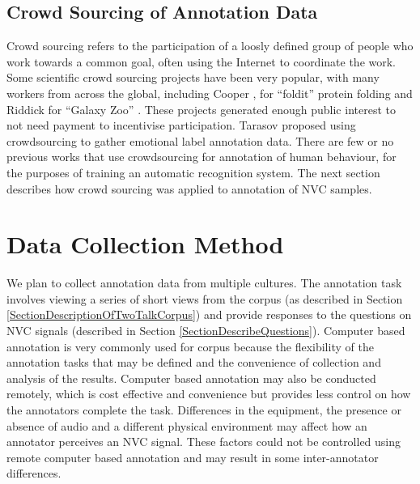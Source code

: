 
\subsection{Crowd Sourcing of Annotation Data}

Crowd sourcing refers to the participation of a loosly defined group of people who work towards a common goal, often using the Internet to coordinate the work. Some scientific crowd sourcing projects have been very popular, with many workers from across the global, including Cooper \etal, \cite{Cooper2010} for ``foldit'' protein folding and Riddick \etal for ``Galaxy Zoo'' \cite{Raddick2010}. These projects generated enough public interest to not need payment to incentivise participation. Tarasov \etal \cite{Tarasov2010} proposed using crowdsourcing to gather emotional label annotation data. There are few or no previous works that use crowdsourcing for annotation of human behaviour, for the purposes of training an automatic recognition system. The next section describes how crowd sourcing was applied to annotation of \ac{NVC} samples.

\section{Data Collection Method}
\label{SectionCrowdSourceDataCollection}

We plan to collect annotation data from multiple cultures. The annotation task involves viewing a series of short views from the corpus (as described in Section \ref{SectionDescriptionOfTwoTalkCorpus}) and provide responses to the questions on \ac{NVC} signals (described in Section \ref{SectionDescribeQuestions}). Computer based annotation is very commonly used for corpus because the flexibility of the annotation tasks that may be defined and the convenience of collection and analysis of the results. Computer based annotation may also be conducted remotely, which is cost effective and convenience but provides less control on how the annotators complete the task. Differences in the equipment, the presence or absence of audio and a different physical environment may affect how an annotator perceives an \ac{NVC} signal. These factors could not be controlled using remote computer based annotation and may result in some inter-annotator differences.

